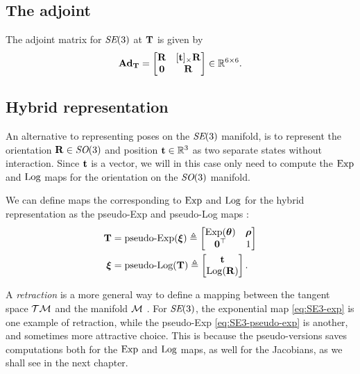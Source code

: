 \subsection{The adjoint}
The adjoint matrix for $\textit{SE}(3)$ at ${\boldsymbol{\mathbf{T}}}$ is given by
\begin{equation}
  \boldsymbol{\mathbf{Ad}}_{\boldsymbol{\mathbf{T}}} = 
  \begin{bmatrix}
    {\boldsymbol{\mathbf{R}}} & [{\boldsymbol{\mathbf{t}}}]_\times {\boldsymbol{\mathbf{R}}}\\
    \boldsymbol{\mathbf{0}} & {\boldsymbol{\mathbf{R}}}
  \end{bmatrix} \in {\mathbb R}^{6 \times 6}.
\end{equation}

\subsection{Hybrid representation} \label{sec:hybrid-representation}
An alternative to representing poses on the $\textit{SE}(3)$ manifold, is to represent the orientation ${\boldsymbol{\mathbf{R}}} \in \textit{SO}(3)$ and position ${\boldsymbol{\mathbf{t}}} \in {\mathbb R}^3$ as two separate states without interaction.
Since ${\boldsymbol{\mathbf{t}}}$ is a vector, we will in this case only need to compute the $\operatorname*{Exp}$ and $\operatorname*{Log}$ maps for the orientation on the $\textit{SO}(3)$ manifold.

We can define maps the corresponding to $\operatorname*{Exp}$ and $\operatorname*{Log}$ for the hybrid representation as the pseudo-Exp and pseudo-Log maps \cite{BlancoAOptimization}:
\begin{align}
    {\boldsymbol{\mathbf{T}}} &= \text{pseudo-Exp}({\boldsymbol{\mathbf{\xi}}}) \triangleq 
    \begin{bmatrix}
      \operatorname*{Exp}({\boldsymbol{\mathbf{\theta}}}) & {\boldsymbol{\mathbf{\rho}}}\\
      \boldsymbol{\mathbf{0}}^{\top} & 1
  \end{bmatrix} \label{eq:SE3-pseudo-exp}\\ 
  {\boldsymbol{\mathbf{\xi}}} &= \text{pseudo-Log}({\boldsymbol{\mathbf{T}}}) \triangleq 
  \begin{bmatrix}
    {\boldsymbol{\mathbf{t}}}\\
    \operatorname*{Log}({\boldsymbol{\mathbf{R}}})
  \end{bmatrix}.
\end{align}

A \emph{retraction} is a more general way to define a mapping between the tangent space $\mathcal{T}\mathcal{M}$ and the manifold $\mathcal{M}$ \cite{Forster2017, Dellaert2017, Absil2008OptimizationManifolds}.
For $\textit{SE}(3)$, the exponential map \eqref{eq:SE3-exp} is one example of retraction, while the pseudo-Exp \eqref{eq:SE3-pseudo-exp} is another, and sometimes more attractive choice.
This is because the pseudo-versions saves computations both for the $\operatorname*{Exp}$ and $\operatorname*{Log}$ maps, as well for the Jacobians, as we shall see in the next chapter.
